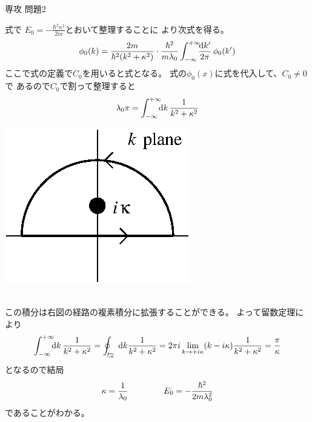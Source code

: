 \documentclass[fleqn]{jbook}
\begin{document}
\begin{answer}{専攻 問題2}{}
\begin{subanswers}
\begin{subsubanswers}
  \SubSubAnswer
    \parbox[t]{100mm}{
    式で $E_0=-\frac{\hbar^2 \kappa^2}{2m}$とおいて整理することに
    より次式を得る。
%
    \[ \phi_0(k) =%
        \frac{2m}{\hbar^2(k^2+\kappa^2)}\cdot%
        \frac{\hbar^2}{m\lambda_0}\Iint{\frac{\d{k'}}{2 \pi}} \phi_0(k')\]
%
    ここで式の定義で$C_0$を用いると式となる。
    式の$\phi_0(x)$に式を代入して、$C_0\neq 0$ で
    あるので$ C_0 $で割って整理すると
%
    \[ \lambda_0\pi = \int_{-\infty}^{+\infty}\!\!\!{{\rm d}k}\,\frac{1}{k^2+\kappa^2} \]
%
    }\parbox[t]{50mm}{
    \begin{center}
      \mbox{\includegraphics[clip]{1996phy2-3.eps}}
    \end{center}}\\
%
    この積分は右図の経路の複素積分に拡張することができる。
    よって留数定理により
%
    \[ \Iint{\d{k}}\frac{1}{k^2+\kappa^2}%
       = \oint_\ucycle\d{k}\frac{1}{k^2+\kappa^2}%
       = 2\pi i \lim_{k\to +i\kappa}(k-i\kappa)\frac{1}{k^2+\kappa^2}%
       = \frac{\pi}{\kappa} \]
%
   となるので結局
%
    \[ \kappa =  \frac{1}{\lambda_0} \hspace{15mm}%
        E_0   = -\frac{\hbar^2}{2m\lambda_0^2} \]
%
    であることがわかる。


\end{subsubanswers}
\end{subanswers}
\end{answer}
\end{document}
